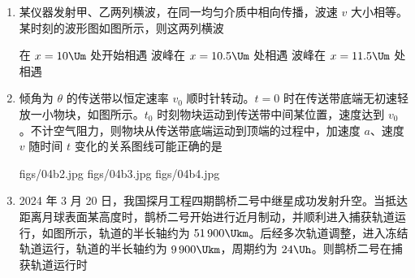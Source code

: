 \documentclass[\gkver]{gaokaozhenti}
\begin{document}
\begin{enumerate}
{可得此过程中人与滑板克服摩擦力做的功为 $W_{f} = mgh - \frac{1}{2}mv^{2}$

故选 D。
}

\item
某仪器发射甲、乙两列横波，在同一均匀介质中相向传播，波速 $v$ 大小相等。某时刻的波形图如图所示，则这两列横波


{在 $x = 10 \Um$ 处开始相遇}
{波峰在 $x = 10.5 \Um$ 处相遇}
{波峰在 $x = 11.5 \Um$ 处相遇}


\item
倾角为 $\theta$ 的传送带以恒定速率 $v_{0}$ 顺时针转动。$t = 0$ 时在传送带底端无初速轻放一小物块，如图所示。$t_{0}$ 时刻物块运动到传送带中间某位置，速度达到 $v_{0}$。不计空气阻力，则物块从传送带底端运动到顶端的过程中，加速度 $a$、速度 $v$ 随时间 $t$ 变化的关系图线可能正确的是


{figs/04b2.jpg}
{figs/04b3.jpg}
{figs/04b4.jpg}


\item
2024 年 3 月 20 日，我国探月工程四期鹊桥二号中继星成功发射升空。当抵达距离月球表面某高度时，鹊桥二号开始进行近月制动，并顺利进入捕获轨道运行，如图所示，轨道的半长轴约为 $51\,900 \Ukm$。后经多次轨道调整，进入冻结轨道运行，轨道的半长轴约为 $9\,900 \Ukm$，周期约为 $24 \Uh$。则鹊桥二号在捕获轨道运行时


\end{enumerate}
\end{document}
